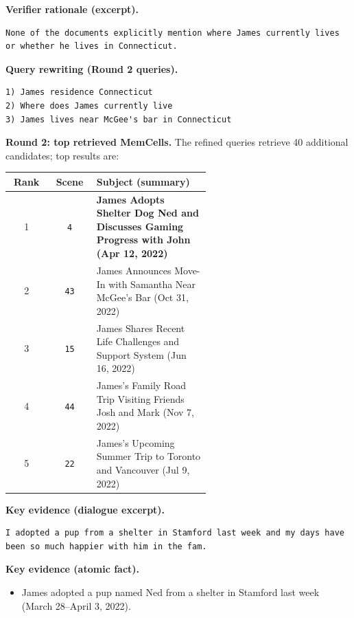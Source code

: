 \noindent\textbf{Verifier rationale (excerpt).}
{\footnotesize
\begin{Verbatim}[breaklines=true,breakanywhere=true]
None of the documents explicitly mention where James currently lives or whether he lives in Connecticut.
\end{Verbatim}
}

\noindent\textbf{Query rewriting (Round 2 queries).}
{\footnotesize
\begin{Verbatim}[breaklines=true,breakanywhere=true]
1) James residence Connecticut
2) Where does James currently live
3) James lives near McGee's bar in Connecticut
\end{Verbatim}
}

\noindent\textbf{Round 2: top retrieved MemCells.} The refined queries retrieve 40 additional candidates; top results are:
{\small
\begin{center}
\setlength{\tabcolsep}{2pt}
\renewcommand{\arraystretch}{1.05}
\begin{tabular}{@{}c c p{0.58\linewidth}@{}}
\toprule
\textbf{Rank} & \textbf{Scene} & \textbf{Subject (summary)} \\
\midrule
1 & \texttt{4} & \textbf{James Adopts Shelter Dog Ned and Discusses Gaming Progress with John (Apr 12, 2022)} \\
2 & \texttt{43} & James Announces Move-In with Samantha Near McGee's Bar (Oct 31, 2022) \\
3 & \texttt{15} & James Shares Recent Life Challenges and Support System (Jun 16, 2022) \\
4 & \texttt{44} & James's Family Road Trip Visiting Friends Josh and Mark (Nov 7, 2022) \\
5 & \texttt{22} & James's Upcoming Summer Trip to Toronto and Vancouver (Jul 9, 2022) \\
\bottomrule
\end{tabular}
\end{center}
}

\noindent\textbf{Key evidence (dialogue excerpt).}
{\footnotesize
\begin{Verbatim}[breaklines=true,breakanywhere=true]
I adopted a pup from a shelter in Stamford last week and my days have been so much happier with him in the fam.
\end{Verbatim}
}

\noindent\textbf{Key evidence (atomic fact).}
\begin{itemize}
\item James adopted a pup named Ned from a shelter in Stamford last week (March 28--April 3, 2022).
\end{itemize}

